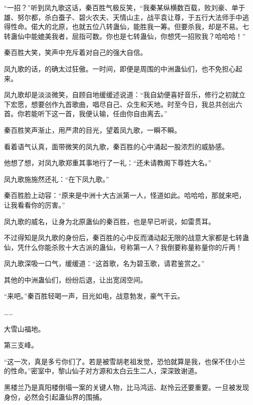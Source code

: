 
\begin{this_body}



“一招？”听到凤九歌这话，秦百胜气极反笑，“我秦某纵横数百载，败刘豪、单于雄、努尔都，杀白蚕子、碧火农夫、天情山主，战平袁让尊，于五行大法师手中逃得性命。偌大的北原，也就五位八转蛊仙，能胜我一筹。但要杀我，却是不易。七转蛊仙中能媲美我者，屈指可数。你也是七转蛊仙，你想凭一招败我？哈哈哈！”

秦百胜大笑，笑声中充斥着对自己的强大自信。

凤九歌的话，的确太过狂傲。一时间，即便是周围的中洲蛊仙们，也不免担心起来。

凤九歌却是淡淡微笑，自顾自地缓缓述说道：“我自幼便喜好音乐，修行之初就立下宏愿，想要创作九首歌曲，唱尽自己、众生和天地。时至今日，我总共创出六首。你若能听下这一首，我便认输，任由你自由离去。”

秦百胜笑声渐止，用严肃的目光，望着凤九歌，一瞬不瞬。

看着语气认真，面带微笑的凤九歌，秦百胜的心中涌起一股浓烈的威胁感。

他想了想，对凤九歌郑重其事地行了一礼：“还未请教阁下尊姓大名。”

凤九歌施施然还礼：“在下凤九歌。”

秦百胜脸上动容：“原来是中洲十大古派第一人，怪道如此。哈哈哈，那就来吧，让我看看你的厉害。”

凤九歌的威名，让身为北原蛊仙的秦百胜，也是早已听说，如雷贯耳。

不过得知是凤九歌的身份后，秦百胜的心中反而涌动起无限的战意大家都是七转蛊仙，凭什么你能杀败十大古派的蛊仙，号称第一人？我倒要称量称量你的斤两！

凤九歌深吸一口气，缓缓道：“这首歌，名为碧玉歌，请君鉴赏之。”

其他的中洲蛊仙们，纷纷后退，让出宽阔空间。

“来吧。”秦百胜轻喝一声，目光如电，战意勃发，豪气干云。

……

大雪山福地。

第三支峰。

“这一次，真是多亏你们了。若是被雪胡老祖发觉，恐怕就算是我，也保不住小兰的性命。”密室中，黎山仙子对方源和太白云生二人，深深致谢道。

黑楼兰乃是真阳楼倒塌一案的关键人物，比马鸿运、赵怜云还要重要。一旦被发现身份，必然会引起蛊仙界的围捕。


\end{this_body}
